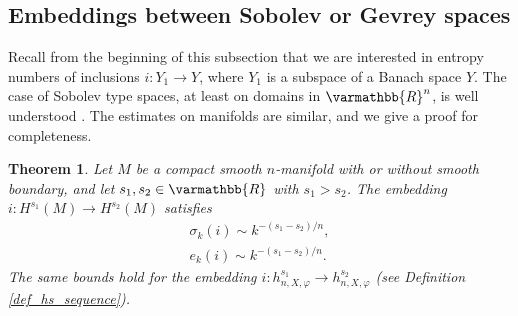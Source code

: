 \documentclass[12pt,twoside]{amsart}
\numberwithin{equation}{section}
\renewcommand{\mathbb}{\varmathbb}
\newtheorem{theorem}{Theorem}[section]
\newcommand{\mR}{\mathbb{R}}                    %
\begin{document}
\subsection{Embeddings between Sobolev or Gevrey spaces}

Recall from the beginning of this subsection that we are interested in entropy numbers of inclusions $i: Y_1 \to Y$, where $Y_1$ is a subspace of a Banach space $Y$. The case of Sobolev type spaces, at least on domains in $\mR^n$, is well understood \cite{ET08}. The estimates on manifolds are similar, and we give a proof for completeness.

\begin{theorem} \label{thm_sobolev_inclusion}
Let $M$ be a compact smooth $n$-manifold with or without smooth boundary, and let $s_1, s_2 \in \mR$ with $s_1 > s_2$. The embedding $i: H^{s_1}(M) \to H^{s_2}(M)$ satisfies 
\begin{gather*}
\sigma_k(i) \sim k^{-(s_1-s_2)/n}, \\
e_k(i) \sim k^{-(s_1-s_2)/n}.
\end{gather*}
The same bounds hold for the embedding $i: h^{s_1}_{n,X,\varphi} \to h^{s_2}_{n,X,\varphi}$ (see Definition \ref{def_hs_sequence}).
\end{theorem}
\end{document}
